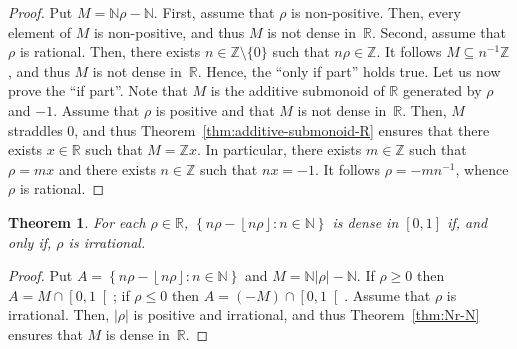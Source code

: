 \documentclass[12pt]{article}
\newcommand{\bZ}{\mathbb{Z}}
\newcommand{\bN}{\mathbb{N}} %
\newcommand{\bR}{\mathbb{R}}
\newcommand{\floor}[1]{\left\lfloor #1  \right\rfloor}
\newcommand{\abs}[1]{\left| #1 \right|}
\newtheorem{theorem}{Theorem}
\theoremstyle{definition}
\begin{document}
\begin{proof}
  Put $M = \bN \rho - \bN$.
  First, assume that $\rho$ is non-positive.
  Then, every element of $M$ is non-positive, and thus $M$ is not dense in~$\bR$.
  Second, assume that $\rho$ is rational.
  Then, there exists $n \in \bZ \setminus \{ 0 \}$ such that $n \rho \in \bZ$.
  It follows $M \subseteq n^{-1} \bZ$, and thus $M$ is not dense in~$\bR$.
  Hence, the ``only if part'' holds true.
  Let us now prove the ``if part''.
  Note that $M$ is the additive submonoid of $\bR$ generated by $\rho$ and $- 1$.
  Assume that $\rho$ is positive and that $M$ is not dense in~$\bR$.
  Then, $M$ straddles $0$,
  and thus Theorem~\ref{thm:additive-submonoid-R} ensures that there exists $x \in \bR$ such that $M = \bZ x$.
  In particular, there exists $m \in \bZ$ such that $\rho = m x$ and there exists $n \in \bZ$ such that $n x = - 1$.
  It follows $\rho = - m n^{-1}$, whence $\rho$ is rational.
\end{proof}

\begin{theorem}
  For each $\rho \in \bR$,
   $\left\{ n \rho - \floor{n \rho} : n \in \bN \right\}$ is dense in $[0, 1]$ if, and only if,
   $\rho$ is irrational.
 \end{theorem}

 \begin{proof}
   Put
   $A = \left\{ n \rho - \floor{n \rho} : n \in \bN \right\}$ and $M = \bN \abs{ \rho } - \bN$.
   If $\rho \ge 0$ then $A = M \cap \left[0, 1 \right[$;
   if $\rho \le 0$ then $A = (- M) \cap \left[0, 1 \right[$.
   Assume that $\rho$ is irrational.
   Then, $\abs{\rho}$ is positive and irrational, and thus Theorem~\ref{thm:Nr-N} ensures that $M$ is dense in~$\bR$.
   
   
   
  \end{proof}
 

 



\end{document}
